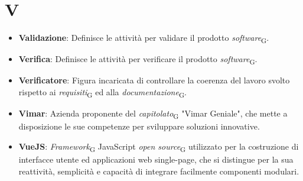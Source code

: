 \section{V}
\begin{itemize}
    \item \textbf{Validazione}: Definisce le attività per validare il prodotto \textit{software}\textsubscript{G}.
    \item \textbf{Verifica}: Definisce le attività per verificare il prodotto \textit{software}\textsubscript{G}.
    \item \textbf{Verificatore}: Figura incaricata di controllare la coerenza del lavoro svolto rispetto ai \textit{requisiti}\textsubscript{G} ed alla \textit{documentazione}\textsubscript{G}.
    \item \textbf{Vimar}: Azienda proponente del \textit{capitolato}\textsubscript{G} "Vimar Geniale", che mette a disposizione le sue competenze per sviluppare soluzioni innovative.
    \item \textbf{VueJS}: \textit{Framework}\textsubscript{G} JavaScript \textit{open source}\textsubscript{G} utilizzato per la costruzione di interfacce utente ed applicazioni web single-page, che si distingue per la sua reattività, semplicità e capacità di integrare facilmente componenti modulari.
\end{itemize}
